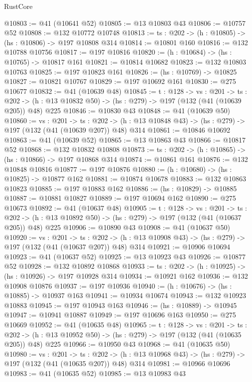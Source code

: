 \begin{lexlean}{RustCore}
\begin{coremodule}
@10803 := @41 (@10641 @52)
@10805 := @13 @10803 @43
@10806 := @10757 @52
@10808 := @132 @10772 @10748
@10813 := {ts : @202} -> (h : @10805) -> (hs : @10806) -> @197 @10808 @314
@10814 := @10801 @160
@10816 := @132 @10788 @10756
@10817 := @197 @10816
@10820 := (h : @10684) -> (hs : @10765) -> @10817 @161
@10821 := @10814 @10682
@10823 := @132 @10803 @10763
@10825 := @197 @10823 @161
@10826 := (hs : @10769) -> @10825
@10827 := @10821 @10767
@10829 := @197 @10692 @161
@10830 := @275 @10677
@10832 := @41 (@10639 @48)
@10845 := {t : @128} ->
  {vs : @201} ->
  {ts : @202} -> (h : @13 @10832 @50) -> (hs : @279) -> @197 (@132 (@41 (@10639 @205)) @48) @225
@10846 := @10830 @43
@10848 := @41 (@10639 @50)
@10860 := {vs : @201} ->
  {ts : @202} -> (h : @13 @10848 @43) -> (hs : @279) -> @197 (@132 (@41 (@10639 @207)) @48) @314
@10861 := @10846 @10692
@10863 := @41 (@10639 @52)
@10865 := @13 @10863 @43
@10866 := @10817 @52
@10868 := @132 @10832 @10808
@10873 := {ts : @202} -> (h : @10865) -> (hs : @10866) -> @197 @10868 @314
@10874 := @10861 @161
@10876 := @132 @10848 @10816
@10877 := @197 @10876
@10880 := (h : @10680) -> (hs : @10825) -> @10877 @162
@10881 := @10874 @10678
@10883 := @132 @10863 @10823
@10885 := @197 @10883 @162
@10886 := (hs : @10829) -> @10885
@10887 := @10881 @10827
@10889 := @197 @10694 @162
@10890 := @275 @10673
@10892 := @41 (@10637 @48)
@10905 := {t : @128} ->
  {vs : @201} ->
  {ts : @202} -> (h : @13 @10892 @50) -> (hs : @279) -> @197 (@132 (@41 (@10637 @205)) @48) @225
@10906 := @10890 @43
@10908 := @41 (@10637 @50)
@10920 := {vs : @201} ->
  {ts : @202} -> (h : @13 @10908 @43) -> (hs : @279) -> @197 (@132 (@41 (@10637 @207)) @48) @314
@10921 := @10906 @10694
@10923 := @41 (@10637 @52)
@10925 := @13 @10923 @43
@10926 := @10877 @52
@10928 := @132 @10892 @10868
@10933 := {ts : @202} -> (h : @10925) -> (hs : @10926) -> @197 @10928 @314
@10934 := @10921 @162
@10936 := @132 @10908 @10876
@10937 := @197 @10936
@10940 := (h : @10676) -> (hs : @10885) -> @10937 @163
@10941 := @10934 @10674
@10943 := @132 @10923 @10883
@10945 := @197 @10943 @163
@10946 := (hs : @10889) -> @10945
@10947 := @10941 @10887
@10949 := @197 @10696 @163
@10950 := @275 @10669
@10952 := @41 (@10635 @48)
@10965 := {t : @128} ->
  {vs : @201} ->
  {ts : @202} -> (h : @13 @10952 @50) -> (hs : @279) -> @197 (@132 (@41 (@10635 @205)) @48) @225
@10966 := @10950 @43
@10968 := @41 (@10635 @50)
@10980 := {vs : @201} ->
  {ts : @202} -> (h : @13 @10968 @43) -> (hs : @279) -> @197 (@132 (@41 (@10635 @207)) @48) @314
@10981 := @10966 @10696
@10983 := @41 (@10635 @52)
@10985 := @13 @10983 @43

\end{coremodule}
\end{lexlean}
